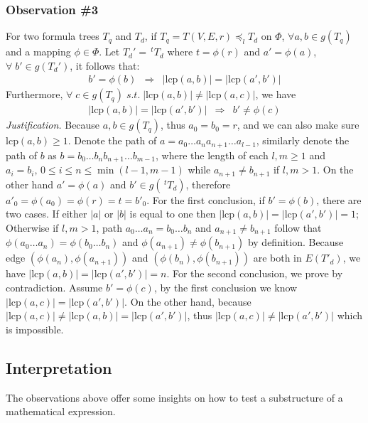 \subsubsection{Observation \#3} 
\label{observation3}
For two formula trees $T_q$ and $T_d$, if $T_q = T(V,E,r) \preceq_l T_d$ on $\Phi$,  
$\forall a,b \in g(T_q)$ and a mapping $\phi \in \Phi$. 
Let $T_d' = \, ^{t}T_d$ where $t = \phi(r)$ and $a' = \phi(a)$, $\forall\; b' \in g(T_d')$, it follows that:
$$
\begin{array}{lcr}
b' = \phi(b)  & \Rightarrow & 
\left| \mathrm{lcp}(a,b) \right| = \left| \mathrm{lcp}(a',b') \right|
\end{array}
$$
Furthermore, $\forall\; c \in g(T_q)\; s.t.\; \left| \mathrm{lcp}(a,b) \right| \neq \left| \mathrm{lcp}(a,c) \right| $, we have
$$
\begin{array}{lcr}
\left| \mathrm{lcp}(a,b) \right| = \left| \mathrm{lcp}(a',b') \right|
& \Rightarrow &
b' \neq \phi(c)
\end{array} 
$$
\textit{Justification.} 
Because $a,b \in g(T_q)$, thus $a_0 = b_0 = r$, and we can also make sure $\mathrm{lcp}(a,b) \ge 1$. 
Denote the path of $a = a_0 \ldots a_n a_{n+1} \ldots a_{l-1}$, similarly denote the path of $b$ as $b=b_0 \ldots b_n b_{n+1} \ldots b_{m-1}$,
where the length of each $l,m \ge 1$ and $a_i = b_i,\, 0 \le i \le n \le \min(l-1, m-1)$ while $a_{n+1} \neq b_{n+1}$ if $l,m > 1$.
On the other hand $a' = \phi(a)$ and $b' \in g(\,^{t}T_d)$, therefore $a'_0 = \phi(a_0) = \phi(r) = t = b'_0$.
For the first conclusion, if $b' = \phi(b)$, there are two cases. If either $|a|$ or $|b|$ is equal to one then $\left| \mathrm{lcp}(a,b) \right| = \left| \mathrm{lcp}(a',b') \right| = 1$;
Otherwise if $l,m > 1$, path $a_0 \ldots a_n = b_0 \ldots b_n$ and $a_{n+1} \neq b_{n+1}$ follow that $\phi(a_0 \ldots a_n) = \phi(b_0 \ldots b_n)$ and $\phi(a_{n+1}) \neq \phi(b_{n+1})$ by definition.
Because edge $(\phi(a_n), \phi(a_{n+1}))$ and $(\phi(b_n), \phi(b_{n+1}))$ are both in $E(T'_d)$, 
we have $\left| \mathrm{lcp}(a,b) \right| = \left| \mathrm{lcp}(a',b') \right| = n$.
For the second conclusion, we prove by contradiction. 
Assume $b' = \phi(c)$, by the first conclusion we know $\left| \mathrm{lcp}(a,c) \right| = \left| \mathrm{lcp}(a',b') \right|$.
On the other hand, because $\left| \mathrm{lcp}(a,c) \right| \neq \left| \mathrm{lcp}(a,b) \right| =  \left| \mathrm{lcp}(a',b') \right|$, 
thus $\left| \mathrm{lcp}(a,c) \right| \neq \left| \mathrm{lcp}(a',b') \right|$ which is impossible. 


\subsection{Interpretation}
\label{labelinterp}
The observations above offer some insights on how to test a substructure of a mathematical expression. 

